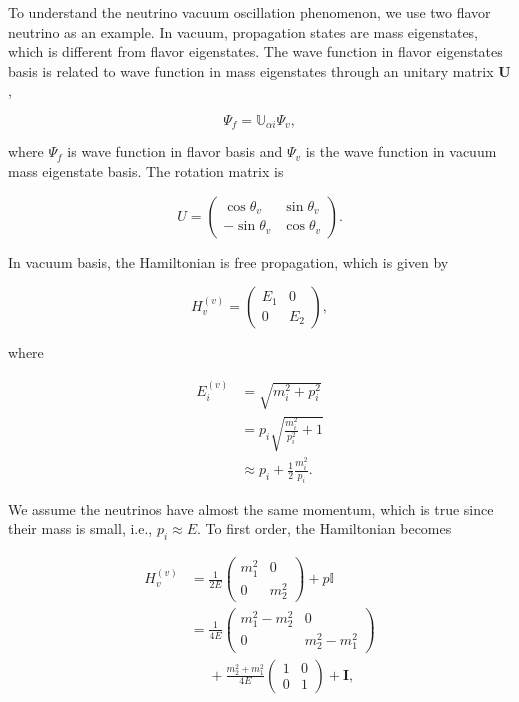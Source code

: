 \documentclass[%
 aip,
 jmp,%
 amsmath,amssymb,
 reprint,%
]{revtex4-1}
\begin{document}
To understand the neutrino vacuum oscillation phenomenon, we use two flavor neutrino as an example. In vacuum, propagation states are mass eigenstates, which is different from flavor eigenstates. The wave function in flavor eigenstates basis is related to wave function in mass eigenstates through an unitary matrix $\mathbf U$,

\begin{equation}
\Psi_f = \mathbb{U}_{\alpha i}\Psi_{v},
\end{equation}

where $\Psi_f$ is wave function in flavor basis and $\Psi_v$ is the wave function in vacuum mass eigenstate basis. The rotation matrix is

\begin{equation}
U = \begin{pmatrix} \cos\theta_v & \sin \theta_v \\ -\sin \theta_v & \cos \theta_v \end{pmatrix}.
\end{equation}

In vacuum basis, the Hamiltonian is free propagation, which is given by

\begin{equation}
H_v^{(v)} = \begin{pmatrix} E_1 & 0 \\
0 & E_2
\end{pmatrix},
\end{equation}

where

\begin{align}
E_i^{(v)} & = \sqrt{m_i^2 + p_i^2 } \\
& = p_i \sqrt{\frac{m_i^2}{p_i^2} + 1} \\
& \approx p_i + \frac{1}{2} \frac{m_i^2}{p_i}.
\end{align}

We assume the neutrinos have almost the same momentum, which is true since their mass is small, i.e., $p_i \approx E$. To first order, the Hamiltonian becomes

\begin{align*}
H_v^{(v)} &= \frac{1}{2E} \begin{pmatrix}
m_1^2 & 0 \\
0 & m_2^2
\end{pmatrix} + p \mathbb{I}\\
& =  \frac{1}{4E} \begin{pmatrix}
m_1^2 - m_2^2 & 0 \\
0 & m_2^2 - m_1^2
\end{pmatrix} \\
&\phantom{=}+ \frac{m_2^2 + m_1^2}{4E} \begin{pmatrix}
1 & 0 \\
0 & 1
\end{pmatrix} + \mathbf{I},
\end{align*}
\end{document}
